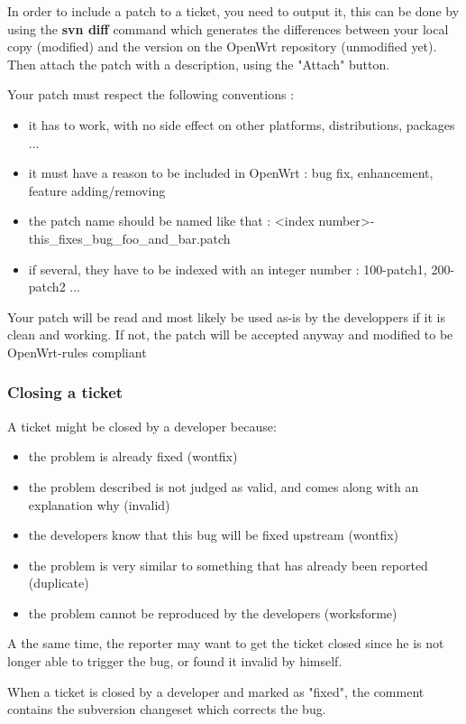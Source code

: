 In order to include a patch to a ticket, you need to output it, this can be done by using the \textbf{svn diff} command which generates the differences between your local copy (modified) and the version on the OpenWrt repository (unmodified yet). Then attach the patch with a description, using the "Attach" button.

Your patch must respect the following conventions :

\begin{itemize}
\item it has to work, with no side effect on other platforms, distributions, packages ...
\item it must have a reason to be included in OpenWrt : bug fix, enhancement, feature adding/removing
\item the patch name should be named like that : <index number>-this\_fixes\_bug\_foo\_and\_bar.patch
\item if several, they have to be indexed with an integer number : 100-patch1, 200-patch2 ...
\end{itemize}

Your patch will be read and most likely be used as-is by the developpers if it is clean and working. If not, the patch will be accepted anyway and modified to be OpenWrt-rules compliant

\subsubsection{Closing a ticket}

A ticket might be closed by a developer because:

\begin{itemize}
\item the problem is already fixed (wontfix)
\item the problem described is not judged as valid, and comes along with an explanation why (invalid)
\item the developers know that this bug will be fixed upstream (wontfix)
\item the problem is very similar to something that has already been reported (duplicate)
\item the problem cannot be reproduced by the developers (worksforme)
\end{itemize}

A the same time, the reporter may want to get the ticket closed since he is not 
longer able to trigger the bug, or found it invalid by himself.

When a ticket is closed by a developer and marked as "fixed", the comment contains 
the subversion changeset which corrects the bug.
